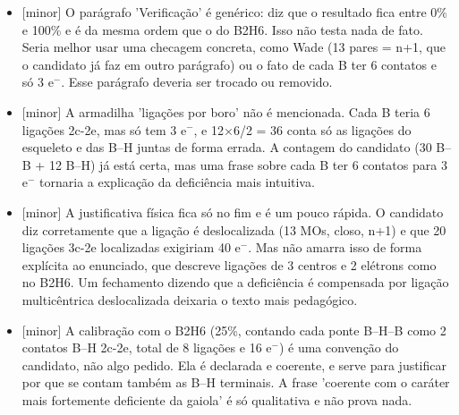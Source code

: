 \documentclass{article}%
\begin{document}
\begin{itemize}%
\item%
{[}minor{]} O parágrafo 'Verificação' é genérico: diz que o resultado fica entre 0\% e 100\% e é da mesma ordem que o do B2H6. Isso não testa nada de fato. Seria melhor usar uma checagem concreta, como Wade (13 pares = n+1, que o candidato já faz em outro parágrafo) ou o fato de cada B ter 6 contatos e só 3 e$^{-}$. Esse parágrafo deveria ser trocado ou removido.%
\item%
{[}minor{]} A armadilha 'ligações por boro' não é mencionada. Cada B teria 6 ligações 2c{-}2e, mas só tem 3 e$^{-}$, e 12$\times$6/2 = 36 conta só as ligações do esqueleto e das B--H juntas de forma errada. A contagem do candidato (30 B--B + 12 B--H) já está certa, mas uma frase sobre cada B ter 6 contatos para 3 e$^{-}$ tornaria a explicação da deficiência mais intuitiva.%
\item%
{[}minor{]} A justificativa física fica só no fim e é um pouco rápida. O candidato diz corretamente que a ligação é deslocalizada (13 MOs, closo, n+1) e que 20 ligações 3c{-}2e localizadas exigiriam 40 e$^{-}$. Mas não amarra isso de forma explícita ao enunciado, que descreve ligações de 3 centros e 2 elétrons como no B2H6. Um fechamento dizendo que a deficiência é compensada por ligação multicêntrica deslocalizada deixaria o texto mais pedagógico.%
\item%
{[}minor{]} A calibração com o B2H6 (25\%, contando cada ponte B--H--B como 2 contatos B--H 2c{-}2e, total de 8 ligações e 16 e$^{-}$) é uma convenção do candidato, não algo pedido. Ela é declarada e coerente, e serve para justificar por que se contam também as B--H terminais. A frase 'coerente com o caráter mais fortemente deficiente da gaiola' é só qualitativa e não prova nada.%
\end{itemize}%
\end{document}
